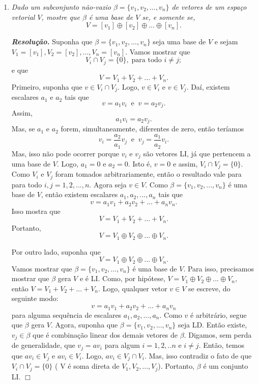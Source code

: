 \begin{enumerate}
\item \textit{Dado um subconjunto não-vazio $\beta=\{v_1, v_2,..., v_n\}$ de  vetores de um espaço vetorial $V$, mostre que   $\beta$ é uma base de $V$ se, e somente se,  $$V=[v_1]\oplus [v_2]\oplus...\oplus[v_n].$$}

\textit{\textbf{Resolução.}} Suponha que $\beta=\{v_1, v_2,..., v_n\}$ seja uma base de $V$ e sejam $V_1=[v_1], V_2= [v_2], ...,V_n=[v_n]$. Vamos mostrar que $$V_i \cap V_j=\{0\}, \; \text{para todo $i \neq j$};$$  e que $$ V=V_1 +V_2 + ...+ V_n.$$ Primeiro, suponha que $ v \in V_i \cap V_j$. Logo, $v \in V_i$ e $ v \in V_j$. Daí, existem escalares  $a_1$ e $a_2$ tais que  $$ v=a_1v_i \; \; \text{e} \; \; v=a_2v_j.$$ Assim, $$ a_1v_i=a_2v_j.$$  Mas, se $a_1$ e $a_2$ forem, simultaneamente, diferentes de zero, então teríamos
$$ v_i=\dfrac{a_2}{a_1}v_j \; \; \text{e} \; \;  v_j=\dfrac{a_1}{a_2}v_i.$$  Mas, isso não pode ocorrer porque $v_i$ e $v_j$ são vetores LI, já que pertencem a uma base de $V$. Logo, $a_1=0$ e $a_2=0$. Isto é, $v=0$ e assim, $V_i \cap V_j=\{0\}$. Como $V_i$ e $V_j$ foram tomados arbitrariamente, então o resultado vale para para todo $i, j=1,2,...,n$.  Agora seja $v \in V$. Como $\beta=\{v_1, v_2,..., v_n\}$ é uma base de $V$, então existem escalares $a_1, a_2,...,a_n $ tais que $$v=a_1v_1+a_2 v_2+...+a_n v_n.$$  Isso mostra que  $$V=V_1+V_2+...+V_n.$$ Portanto, $$V=V_1\oplus V_2\oplus...\oplus V_n.$$

Por outro lado, suponha que $$V=V_1\oplus V_2\oplus...\oplus V_n.$$ Vamos mostrar que $\beta=\{v_1, v_2,..., v_n\}$  é uma base de $V$. Para isso, precisamos mostrar que $\beta$ gera $V$ e é LI. Como, por hipótese, $V=V_1\oplus V_2\oplus...\oplus V_n$, então $V=V_1+V_2+...+V_n.$ Logo, qualquer vetor $v \in V$ se escreve, do seguinte modo:$$v=a_1v_1+a_2 v_2+...+a_n v_n $$  para alguma sequência de escalares $a_1, a_2,...,a_n $. Como $v$ é arbitrário, segue que $\beta$ gera $V$. Agora, suponha que $\beta=\{v_1, v_2,..., v_n\}$  seja LD. Então existe, $v_j \in \beta$ que é combinação linear dos demais vetores de $\beta$. Digamos, sem perda de generalidade, que $ v_j=av_i$ para algum $i=1,2,..n$ e $i \neq j$. Então, temos que  $av_i \in V_j$ e $ av_i \in V_i$. Logo, $ av_i \in  V_j \cap V_i$. Mas, isso contradiz o fato de que $  V_i \cap V_j = \{0\}$ ( V é soma direta de $V_1, V_2, ..., V_j$).  Portanto, $ \beta$ é um conjunto LI. $\Box$
\end{enumerate}




